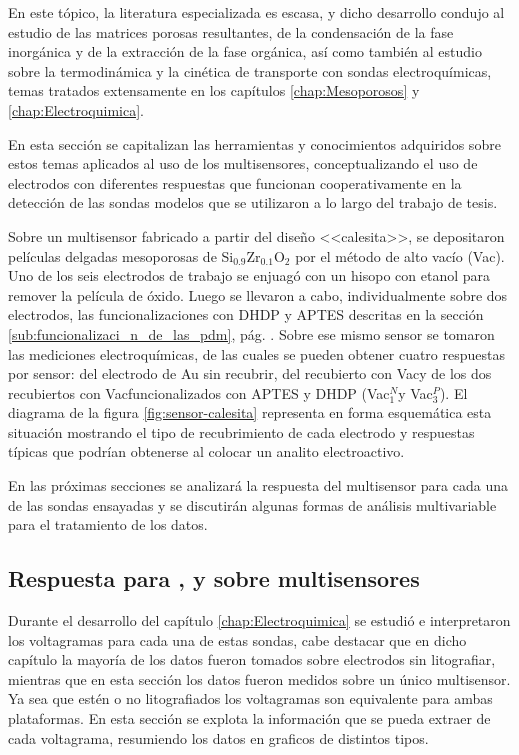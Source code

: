 			En este tópico, la literatura especializada es escasa, y dicho desarrollo condujo al estudio de las matrices porosas resultantes, de la condensación de la fase inorgánica y de la extracción de la fase orgánica, así como también al estudio sobre la termodinámica y la cinética de transporte con sondas electroquímicas, temas tratados extensamente en los capítulos  \ref{chap:Mesoporosos} y \ref{chap:Electroquimica}. 

    		En esta sección se capitalizan las herramientas y conocimientos adquiridos sobre estos temas aplicados al uso de los multisensores, conceptualizando el uso de electrodos con diferentes respuestas que funcionan cooperativamente en la detección de las sondas modelos que se utilizaron a lo largo del trabajo de tesis. 

			Sobre un multisensor fabricado a partir del diseño <<calesita>>, se depositaron películas delgadas mesoporosas de Si$_{0.9}$Zr$_{0.1}$O$_2$ por el método de alto vacío (Vac\pdmZ). Uno de los seis electrodos de trabajo se enjuagó con un hisopo con etanol para remover la película de óxido. Luego se llevaron a cabo, individualmente sobre dos electrodos, las funcionalizaciones con DHDP y APTES descritas en la sección \ref{sub:funcionalizaci_n_de_las_pdm}, pág. \pageref{sub:funcionalizaci_n_de_las_pdm}. Sobre ese mismo sensor se tomaron las mediciones electroquímicas, de las cuales se pueden obtener cuatro respuestas por sensor: del electrodo de Au sin recubrir, del recubierto con Vac\pdmZ\space y de los dos recubiertos con Vac\pdmZ\space funcionalizados con APTES y DHDP (Vac\pdmZ$^N_1$\space y  Vac\pdmZ$^P_3$). El diagrama de la figura \ref{fig:sensor-calesita} representa en forma esquemática esta situación mostrando el tipo de recubrimiento de cada electrodo y respuestas típicas que podrían obtenerse al colocar un analito electroactivo. 

			En las próximas secciones se analizará la respuesta del multisensor para cada una de las sondas ensayadas y se discutirán algunas formas de análisis multivariable para el tratamiento de los datos. 

	\subsection{Respuesta para \ru, \fe\space y \fc\space sobre multisensores}	

		Durante el desarrollo del capítulo \ref{chap:Electroquimica} se estudió e interpretaron los voltagramas para cada una de estas sondas, cabe destacar que en dicho capítulo la mayoría de los datos fueron tomados sobre electrodos sin litografiar, mientras que en esta sección los datos fueron medidos sobre un único multisensor. Ya sea que estén o no litografiados los voltagramas son equivalente para ambas plataformas. En esta sección se explota la información que se pueda extraer de cada voltagrama, resumiendo los datos en graficos de distintos tipos.

